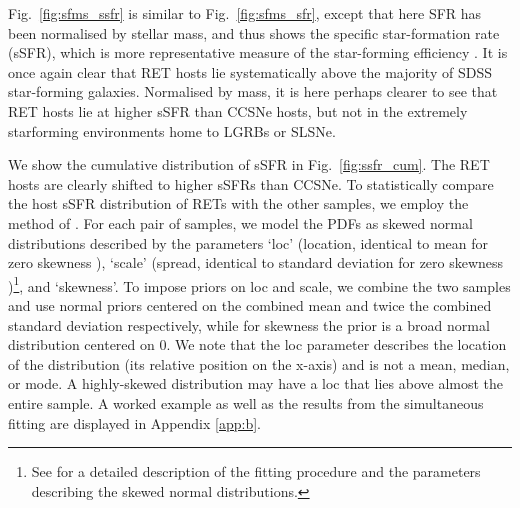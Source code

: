 \documentclass[fleqn,usenatbib,]{mnras}
\newcommand{\replychris}[1]{\color{magenta}#1 \color{black}}
\newcommand{\replylluis}[1]{\color{brown}#1 \color{black}}
\begin{document}
Fig.~\ref{fig:sfms_ssfr} is similar to Fig.~\ref{fig:sfms_sfr}, except that here SFR has been normalised by stellar mass, and thus shows the specific star-formation rate (sSFR), which is more representative measure of the star-forming \replylluis{efficiency}. It is once again clear that RET hosts lie systematically above the majority of SDSS star-forming galaxies. Normalised by mass, it is here perhaps clearer to see that RET hosts lie at higher sSFR than CCSNe hosts, but not in the extremely starforming environments home to LGRBs or SLSNe.

We show the cumulative distribution of sSFR in Fig.~\ref{fig:ssfr_cum}. The RET hosts are clearly shifted to higher sSFRs than CCSNe. To statistically compare the host sSFR distribution of RETs with the other samples, we employ the method of \citet{Wiseman2020}. For each pair of samples, we model the PDFs as skewed normal distributions \replylluis{described by the parameters `loc' (location, identical to mean \replychris{for zero skewness}), `scale' (spread, identical to standard deviation for \replychris{zero skewness})\footnote{See \citet{Wiseman2020} for a detailed description of the fitting procedure and the parameters describing the skewed normal distributions.}, and `skewness'. To impose priors on loc and scale, we combine the two samples and use normal priors centered on the combined mean and twice the combined standard deviation respectively, while for skewness the prior is a broad normal distribution centered on 0. We note that the loc parameter describes the location of the distribution (its relative position on the x-axis) and is not a mean, median, or mode. A highly-skewed distribution may have a loc that lies above almost the entire sample. \replychris{A worked example as well as} the results from the simultaneous fitting are displayed in Appendix \ref{app:b}. }
\end{document}
